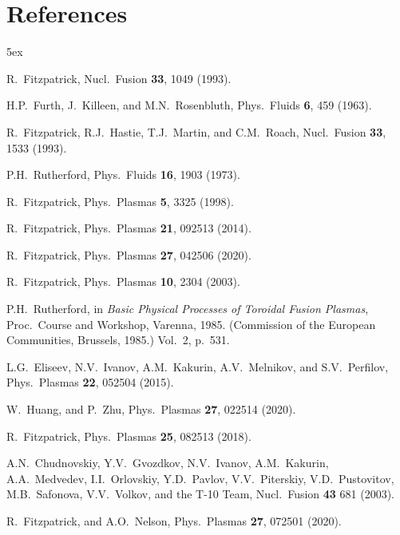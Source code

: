 \documentclass[12pt,prb,aps]{revtex4-1}
\begin{document}
\section*{References}
\begin{thebibliography}{99}\baselineskip 5ex

 R.~Fitzpatrick, Nucl.\ Fusion {\bf 33}, 1049 (1993).

 H.P.~Furth,  J.~Killeen, and M.N.~Rosenbluth,  Phys.\ Fluids {\bf 6}, 459 (1963).

 R.~Fitzpatrick, R.J.~Hastie, T.J.~Martin, and C.M.~Roach, Nucl.\ Fusion {\bf 33}, 1533 (1993).

 P.H.~Rutherford,  Phys.\ Fluids  {\bf 16}, 1903 (1973).

 R.~Fitzpatrick, Phys.\ Plasmas {\bf 5}, 3325 (1998).

 R.~Fitzpatrick, Phys.\ Plasmas {\bf 21}, 092513 (2014).

 R.~Fitzpatrick, Phys.\ Plasmas {\bf 27}, 042506 (2020).

 R.~Fitzpatrick, Phys.\ Plasmas {\bf 10}, 2304 (2003).

 P.H.~Rutherford, in  {\it Basic Physical Processes of
Toroidal Fusion Plasmas}, Proc.\ Course and Workshop, Varenna, 1985. (Commission of the European Communities, Brussels, 1985.) Vol.~2, p.~531.

 L.G.~Eliseev, N.V.~Ivanov, A.M.~Kakurin, A.V.~Melnikov, and S.V.~Perfilov, Phys.\ Plasmas {\bf 22}, 052504 (2015). 

 W.~Huang, and P.~Zhu, Phys.\ Plasmas {\bf 27}, 022514 (2020).

 R.~Fitzpatrick, Phys.\ Plasmas {\bf 25}, 082513 (2018).			

 A.N.~Chudnovskiy, Y.V.~Gvozdkov, N.V.~Ivanov, A.M.~Kakurin,
A.A.~Medvedev, I.I.~Orlovskiy, Y.D.~Pavlov, V.V.~Piterskiy, V.D.~Pustovitov,
M.B.~Safonova, V.V.~Volkov, and the T-10 Team, Nucl.\ Fusion {\bf 43} 681 (2003).

 R.~Fitzpatrick, and A.O.~Nelson, Phys.\ Plasmas {\bf 27}, 072501 (2020).

\end{thebibliography}

\end{document}
